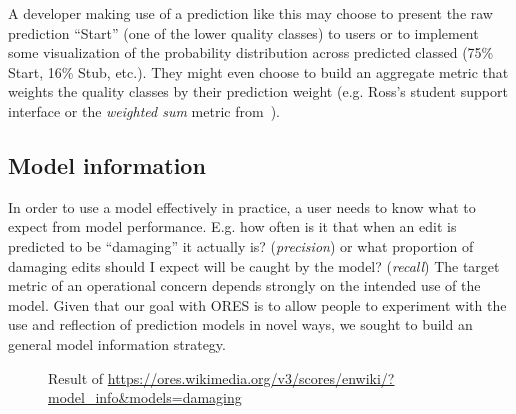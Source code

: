 A developer making use of a prediction like this may choose to present the raw prediction ``Start'' (one of the lower quality classes) to users or to implement some visualization of the probability distribution across predicted classed (75\% Start, 16\% Stub, etc.).  They might even choose to build an aggregate metric that weights the quality classes by their prediction weight (e.g. Ross's student support interface\cite{ross2016visualizing} or the \emph{weighted sum} metric from~\cite{halfaker2017interpolating}).

\subsection{Model information}
\label{sec:appendix.model_information}
In order to use a model effectively in practice, a user needs to know what to expect from model performance.  E.g. how often is it that when an edit is predicted to be ``damaging'' it actually is? (\emph{precision}) or what proportion of damaging edits should I expect will be caught by the model? (\emph{recall})  The target metric of an operational concern depends strongly on the intended use of the model.  Given that our goal with ORES is to allow people to experiment with the use and reflection of prediction models in novel ways, we sought to build an general model information strategy.

\begin{figure}[htbp]
        \caption{Result of \url{https://ores.wikimedia.org/v3/scores/enwiki/?model_info&models=damaging}}
        \label{fig:english_damaging_model_info}
\end{figure}

